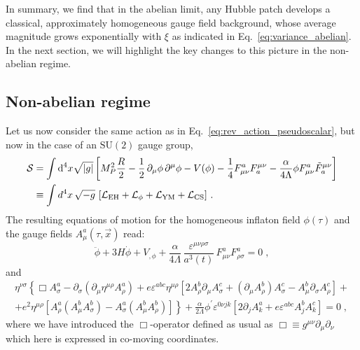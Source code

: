 In summary, we find that in the abelian limit, any Hubble patch develops a classical, approximately homogeneous gauge field background, whose average magnitude grows exponentially with $\xi$ as indicated in Eq.~\eqref{eq:variance_abelian}. In the next section, we will highlight the key changes to this picture in the non-abelian regime. 

\subsection{Non-abelian regime}

Let us now consider the same action as in Eq.~\eqref{eq:rev_action_pseudoscalar}, but now in the case of an $\mathrm{SU}(2)$ gauge group,
\begin{align}
\mathcal{S} & = \int \textrm{d}^4 x \sqrt{|g|} \left[M_P^2 \frac{R}{2} -\frac{1}{2} \, \partial_\mu \phi \, \partial^\mu \phi - V(\phi) - \frac{1}{4} F^a_{\mu \nu} F_a^{\mu \nu} - \frac{\alpha}{4 \Lambda} \phi F^a_{\mu \nu} \tilde F_a^{\mu \nu} \right ] \nonumber \\
& \equiv \int d^4 x \, \sqrt{-g} \, \left[\mathcal{L}_{\rm EH} + \mathcal{L}_{\phi} + \mathcal{L}_{\rm YM} + \mathcal{L}_{\rm CS}\right] \,. \label{eq:action}
\end{align}
The resulting equations of motion for the homogeneous inflaton field $\phi(\tau)$ and the gauge fields $A^a_\mu(\tau,\vec x)$ read:
\begin{equation}
	\ddot{\phi} + 3H \dot{\phi} + V_{,\phi} + \frac{\alpha}{4 \Lambda} \, \frac{\varepsilon^{\mu \nu \rho \sigma} }{ a^3(t)} \, F^a_{\mu\nu} F^a_{\rho\sigma} = 0 \;,
	\label{eq:phib}
\end{equation}
and
\begin{equation}
\begin{aligned}
\label{eq:eq_motion_final}
	\eta^{\nu\sigma} \left\{\Box A_\sigma^a - \partial_\sigma \left(\partial_\mu \eta^{\mu\rho} A_\rho^a \right)+ e \varepsilon^{a b c} \eta^{\mu\rho} \left[ 2A_\rho^b \partial_\mu A_\sigma^c + \left( \partial_\mu A_\rho^b\right) A_\sigma^c - A_\mu^b \partial_\sigma A_\rho^c \right] + \right. \\
	+ \left. e^2 \eta^{\mu\rho} \left[ A_\rho^a \left( A_\mu^b A_\sigma^b \right) - A_\sigma^a \left( A_\mu^b A_\rho^b \right) \right] \right\} + \frac{\alpha}{2 \Lambda} \phi^\prime \varepsilon^{0 \nu j k} \left[2 \partial_j A^a_k + e \varepsilon^{abc} A^b_j A^c_k\right] = 0 \; ,
	\end{aligned}
\end{equation}
where we have introduced the $\Box$-operator defined as usual as $\Box \equiv g^{\mu\nu} \partial_{\mu} \partial_{\nu}$ which here is expressed in co-moving coordinates.

